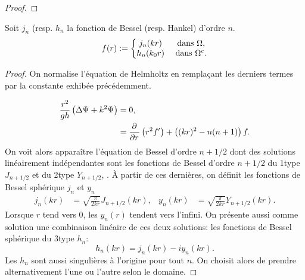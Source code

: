 \begin{proof}




\end{proof}


\begin{prop} Soit \(j_n\) (resp. \(h_n\) la fonction de Bessel (resp. Hankel) d'ordre \(n\).
  \begin{equation}
    f(r) := \left\lbrace
    \begin{matrix}
    j_n(kr) & \text{ dans \(\Omega\)},
    \\
    h_n(k_0r) & \text{ dans } \Omega^c.
    \end{matrix}\right.
  \end{equation}
\end{prop}
\begin{proof}
On normalise l'équation de Helmholtz en remplaçant les derniers termes par la constante exhibée précédemment.

\begin{align*}
\dfrac{r^2}{gh} \left(\Delta \Psi + k^2 \Psi\right) &= 0,
\\
&= \dfrac{\partial^{{}} }{{\partial r}^{{}}}\left(r^2f'\right) + \left((kr)^2 - n(n+1)\right)f.
\end{align*}
  On voit alors apparaître l'équation de Bessel d'ordre \(n +1/2\) dont des solutions linéairement indépendantes sont les fonctions de Bessel d'ordre \(n +1/2\) du 1\ier type \(J_{n+1/2}\) et du 2\ieme type \(Y_{n+1/2}\), \cite[p.~86]{bohren_absorption_2004}\cite[p.~1465]{morse_methods_1953}.
  À partir de ces dernières, on définit les fonctions de Bessel sphérique \(j_n\) et \(y_n\)
  \begin{align*}
  j_n(kr) &= \sqrt{\frac{\pi}{2kr}}J_{n+1/2}(kr), &
  y_n(kr) &= \sqrt{\frac{\pi}{2kr}}Y_{n+1/2}(kr).
  \end{align*}
  Lorsque \(r\) tend vers \(0\), les \(y_n(r)\) tendent vers l'infini. On présente aussi comme solution une combinaison linéaire de ces deux solutions: les fonctions de Bessel sphérique du 3\ieme type \(h_n\):
  \[
  h_n(kr)=j_n(kr)-i y_n(kr).
  \]
  Les \(h_n\) sont aussi singulières à l'origine pour tout \(n\). On choisit alors de prendre alternativement l'une ou l'autre selon le domaine.
  \end{proof}


